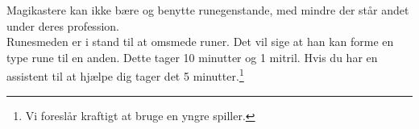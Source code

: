 Magikastere kan ikke bære og benytte runegenstande, med mindre der står andet under deres profession.\\

Runesmeden er i stand til at omsmede runer. Det vil sige at han kan forme en type rune til en anden. Dette tager 10 minutter og 1 mitril. Hvis du har en assistent til at hjælpe dig tager det 5 minutter.\footnote{Vi foreslår kraftigt at bruge en yngre spiller.}\\
 
